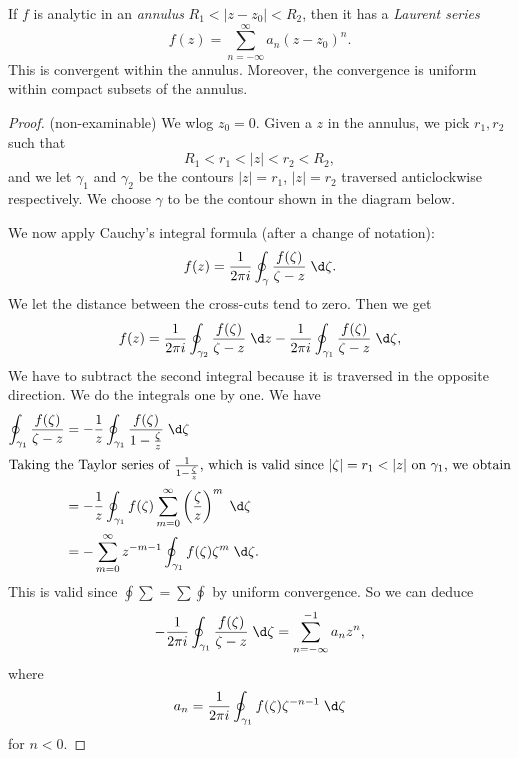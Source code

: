 \documentclass[a4paper]{article}
\begin{document}
\begin{prop}
  If $f$ is analytic in an \emph{annulus} $R_1 < |z - z_0| < R_2$, then it has a \emph{Laurent series}
  \[
    f(z) = \sum_{n = -\infty}^\infty a_n (z - z_0)^n.
  \]
  This is convergent within the annulus. Moreover, the convergence is uniform within compact subsets of the annulus.
\end{prop}

\begin{proof}(non-examinable)
  We wlog $z_0 = 0$. Given a $z$ in the annulus, we pick $r_1, r_2$ such that
  \[
    R_1 < r_1 < |z| < r_2 < R_2,
  \]
  and we let $\gamma_1$ and $\gamma_2$ be the contours $|z| = r_1$, $|z| = r_2$ traversed anticlockwise respectively. We choose $\gamma$ to be the contour shown in the diagram below.
  \begin{center}
  \end{center}
  We now apply Cauchy's integral formula (after a change of notation):
  \[
    f(z) = \frac{1}{2\pi i} \oint_\gamma \frac{f(\zeta)}{\zeta - z} \;\d \zeta.
  \]
  We let the distance between the cross-cuts tend to zero. Then we get
  \[
    f(z) = \frac{1}{2\pi i} \oint_{\gamma_2} \frac{f(\zeta)}{\zeta - z}\;\d z - \frac{1}{2\pi i} \oint_{\gamma_1} \frac{f(\zeta)}{\zeta - z}\;\d \zeta,
  \]
  We have to subtract the second integral because it is traversed in the opposite direction. We do the integrals one by one. We have
  \begin{align*}
    \oint_{\gamma_1} \frac{f(\zeta)}{\zeta - z} &= -\frac{1}{z} \oint_{\gamma_1} \frac{f(\zeta)}{1 - \frac{\zeta}{z}}\;\d \zeta\\
    \intertext{Taking the Taylor series of $\frac{1}{1 - \frac{\zeta}{z}}$, which is valid since $|\zeta| = r_1 < |z|$ on $\gamma_1$, we obtain}
    &= -\frac{1}{z}\oint_{\gamma_1} f(\zeta) \sum_{m = 0}^\infty \left(\frac{\zeta}{z}\right)^m \;\d \zeta\\
    &= -\sum_{m = 0}^\infty z^{-m - 1} \oint_{\gamma_1}f(\zeta) \zeta^m \;\d \zeta.
  \end{align*}
  This is valid since $\oint \sum = \sum \oint$ by uniform convergence. So we can deduce
  \[
    -\frac{1}{2\pi i} \oint_{\gamma_1} \frac{f(\zeta)}{\zeta - z}\;\d \zeta = \sum_{n = -\infty}^{-1} a_n z^n,
  \]
  where
  \[
    a_n = \frac{1}{2\pi i}\oint_{\gamma_1} f(\zeta) \zeta^{-n - 1} \;\d \zeta
  \]
  for $n < 0$.


\end{proof}
\end{document}
